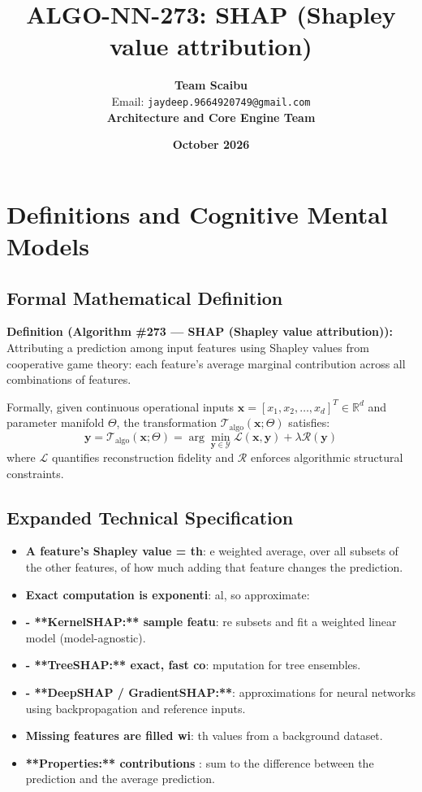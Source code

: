 \documentclass[11pt,a4paper]{article}
\title{\textbf{ALGO-NN-273: SHAP (Shapley value attribution)}}
\author{\textbf{Team Scaibu} \\ \small Email: \texttt{jaydeep.9664920749@gmail.com} \\ \small \textbf{Architecture and Core Engine Team}}
\date{\textbf{October 2026}}
\theoremstyle{definition}
\begin{document}
\maketitle

\section{Definitions and Cognitive Mental Models}

\subsection{Formal Mathematical Definition}
\textbf{Definition (Algorithm \#273 --- SHAP (Shapley value attribution)):}
Attributing a prediction among input features using Shapley values from cooperative game theory: each feature's average marginal contribution across all combinations of features.

Formally, given continuous operational inputs $\mathbf{x} = [x_1, x_2, \dots, x_d]^T \in \mathbb{R}^d$ and parameter manifold $\Theta$, the transformation $\mathcal{T}_{\text{algo}}(\mathbf{x}; \Theta)$ satisfies:
{\boldmath
\begin{equation}
\mathbf{y} = \mathcal{T}_{\text{algo}}(\mathbf{x}; \Theta) = \arg\min_{\mathbf{y} \in \mathcal{Y}} \mathcal{L}(\mathbf{x}, \mathbf{y}) + \lambda \mathcal{R}(\mathbf{y})
\end{equation}
}
where $\mathcal{L}$ quantifies reconstruction fidelity and $\mathcal{R}$ enforces algorithmic structural constraints.

\subsection{Expanded Technical Specification}
\begin{itemize}
\item \textbf{A feature's Shapley value = th}: e weighted average, over all subsets of the other features, of how much adding that feature changes the prediction.
\item \textbf{Exact computation is exponenti}: al, so approximate:
\item \textbf{- **KernelSHAP:** sample featu}: re subsets and fit a weighted linear model (model-agnostic).
\item \textbf{- **TreeSHAP:** exact, fast co}: mputation for tree ensembles.
\item \textbf{- **DeepSHAP / GradientSHAP:**}:  approximations for neural networks using backpropagation and reference inputs.
\item \textbf{Missing features are filled wi}: th values from a background dataset.
\item \textbf{**Properties:** contributions }: sum to the difference between the prediction and the average prediction.
\end{itemize}
\end{document}
